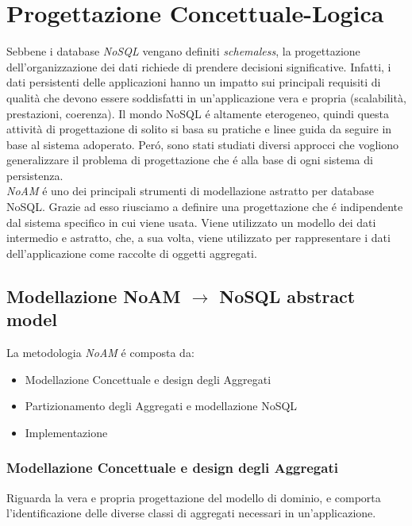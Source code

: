\chapter{Progettazione Concettuale-Logica}
Sebbene i database \emph{NoSQL} vengano definiti \emph{schemaless}, la progettazione dell'organizzazione dei dati richiede
di prendere decisioni significative. Infatti, i dati persistenti delle applicazioni hanno un impatto sui principali requisiti
di qualità che devono essere soddisfatti in un'applicazione vera e propria (scalabilità, prestazioni, coerenza).
Il mondo NoSQL é altamente eterogeneo, quindi questa attività di progettazione di solito si basa su pratiche e linee guida da seguire
in base al sistema adoperato. Peró, sono stati studiati diversi approcci che vogliono generalizzare il problema di progettazione
che é alla base di ogni sistema di persistenza.\\
\emph{NoAM} é uno dei principali strumenti di modellazione astratto per database NoSQL. Grazie ad esso riusciamo a definire
una progettazione che é indipendente dal sistema specifico in cui viene usata. Viene utilizzato un modello dei dati intermedio e astratto,
che, a sua volta, viene utilizzato per rappresentare i dati dell'applicazione come raccolte di oggetti aggregati.
\section{Modellazione NoAM $\to$ NoSQL abstract model}
La metodologia \emph{NoAM} é composta da:
\begin{itemize}
    \item Modellazione Concettuale e design degli Aggregati
    \item Partizionamento degli Aggregati e modellazione NoSQL
    \item Implementazione
\end{itemize}

\subsection{Modellazione Concettuale e design degli Aggregati}
Riguarda la vera e propria progettazione del modello di dominio, e comporta l'identificazione
delle diverse classi di aggregati necessari in un'applicazione.

